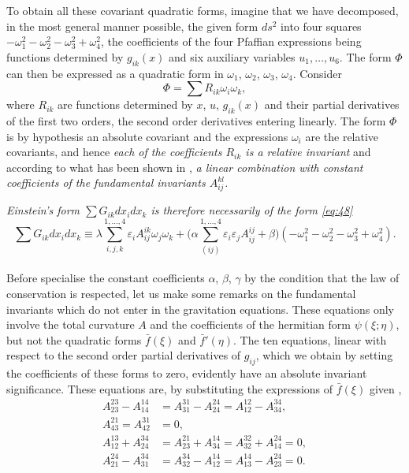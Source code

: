 \documentclass[leqno,12pt]{article}
\makeatletter
\let\old@epsilon\epsilon
\let\old@varepsilon\varepsilon
\let\epsilon\old@varepsilon
\let\varepsilon\old@epsilon
\theoremstyle{shape1}
\theoremstyle{shape0}
\theoremstyle{shape2}
\theoremstyle{definition}
\makeatother
\begin{document}
To obtain all these covariant quadratic forms, imagine that we have decomposed, in the most general manner possible, the given form $ds^{2}$ into four squares $-\omega_{1}^{2}-\omega_{2}^{2}-\omega_{3}^{2}+\omega_{4}^{2}$, the coefficients of the four Pfaffian expressions being functions determined by $g_{ik}(x)$ and six auxiliary variables $u_{1},\dots,u_{6}$. The form $\Phi$ can then be expressed as a quadratic form in $\omega_{1}$, $\omega_{2}$, $\omega_{3}$, $\omega_{4}$. Consider
\[
\Phi=\sum R_{ik}\omega_{i}\omega_{k},
\]
where $R_{ik}$ are functions determined by $x$, $u$, $g_{ik}(x)$ and their partial derivatives of the first two orders, the second order derivatives entering linearly. The form $\Phi$ is by hypothesis an absolute covariant and the expressions $\omega_{i}$ are the relative covariants, and hence \emph{each of the coefficients $R_{ik}$ is a relative invariant} and according to what has been shown in \textsection{\textbf{\ref{sec:25}}}, \emph{a linear combination with constant coefficients of the fundamental invariants $A_{ij}^{kl}$.}

\emph{Einstein's form $\sum G_{ik}dx_{i}dx_{k}$ is therefore necessarily of the form \eqref{eq:48}}
\[
\sum G_{ik}dx_{i}dx_{k}\equiv \lambda\sum_{i,j,k}^{1,\dots,4}\epsilon_{i}A^{ik}_{ij}\omega_{j}\omega_{k}+\bigg(\alpha\sum_{(ij)}^{1,\dots,4}\epsilon_{i}\epsilon_{j}A^{ij}_{ij}+\beta\bigg)(-\omega_{1}^{2}-\omega_{2}^{2}-\omega_{3}^{2}+\omega_{4}^{2}).
\]

\paragraph{}
\label{sec:34}
Before specialise the constant coefficients $\alpha$, $\beta$, $\gamma$ by the condition that the law of conservation is respected, let us make some remarks on the fundamental invariants which do not enter in the gravitation equations. These equations only involve the total curvature $A$ and the coefficients of the hermitian form $\psi(\xi;\eta)$, but not the quadratic forms $\bar f(\xi)$ and $\bar f'(\eta)$. The ten equations, linear with respect to the second order partial derivatives of $g_{ij}$, which we obtain by setting the coefficients of these forms to zero, evidently have an absolute invariant significance. These equations are, by substituting the expressions of $\bar f(\xi)$ given ,
\begin{align*}
  A^{23}_{23}-A^{14}_{14}&=A^{31}_{31}-A^{24}_{24}=A^{12}_{12}-A^{34}_{34},\\
  A^{21}_{43}=A^{31}_{42}&=0,\\
  A^{13}_{12}+A^{34}_{24}&=A^{21}_{23}+A^{14}_{34}=A^{32}_{32}+A^{24}_{14}=0,\\
  A^{24}_{21}-A^{34}_{31}&=A^{34}_{32}-A^{14}_{12}=A^{14}_{13}-A^{24}_{23}=0.
\end{align*}
\end{document}
